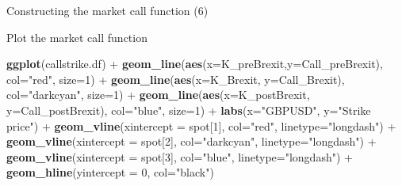 \documentclass[ignorenonframetext,aspectratio=169]{beamer}
\newenvironment{Shaded}{}{}
\newcommand{\KeywordTok}[1]{\textcolor[rgb]{0.00,0.44,0.13}{\textbf{#1}}}
\newcommand{\DataTypeTok}[1]{\textcolor[rgb]{0.56,0.13,0.00}{#1}}
\newcommand{\DecValTok}[1]{\textcolor[rgb]{0.25,0.63,0.44}{#1}}
\newcommand{\StringTok}[1]{\textcolor[rgb]{0.25,0.44,0.63}{#1}}
\newcommand{\OperatorTok}[1]{\textcolor[rgb]{0.40,0.40,0.40}{#1}}
\newcommand{\NormalTok}[1]{#1}
\begin{document}
\begin{frame}[fragile]{Constructing the market call function (6)}

Plot the market call function

\begin{Shaded}
\begin{Highlighting}[]
\KeywordTok{ggplot}\NormalTok{(callstrike.df) }\OperatorTok{+}
\StringTok{  }\KeywordTok{geom_line}\NormalTok{(}\KeywordTok{aes}\NormalTok{(}\DataTypeTok{x=}\NormalTok{K_preBrexit,}\DataTypeTok{y=}\NormalTok{Call_preBrexit), }\DataTypeTok{col=}\StringTok{"red"}\NormalTok{, }\DataTypeTok{size=}\DecValTok{1}\NormalTok{) }\OperatorTok{+}\StringTok{ }
\StringTok{  }\KeywordTok{geom_line}\NormalTok{(}\KeywordTok{aes}\NormalTok{(}\DataTypeTok{x=}\NormalTok{K_Brexit, }\DataTypeTok{y=}\NormalTok{Call_Brexit), }\DataTypeTok{col=}\StringTok{"darkcyan"}\NormalTok{, }\DataTypeTok{size=}\DecValTok{1}\NormalTok{) }\OperatorTok{+}
\StringTok{  }\KeywordTok{geom_line}\NormalTok{(}\KeywordTok{aes}\NormalTok{(}\DataTypeTok{x=}\NormalTok{K_postBrexit, }\DataTypeTok{y=}\NormalTok{Call_postBrexit), }\DataTypeTok{col=}\StringTok{"blue"}\NormalTok{, }\DataTypeTok{size=}\DecValTok{1}\NormalTok{) }\OperatorTok{+}
\StringTok{  }\KeywordTok{labs}\NormalTok{(}\DataTypeTok{x=}\StringTok{"GBPUSD"}\NormalTok{, }\DataTypeTok{y=}\StringTok{"Strike price"}\NormalTok{) }\OperatorTok{+}\StringTok{ }
\StringTok{  }\KeywordTok{geom_vline}\NormalTok{(}\DataTypeTok{xintercept =}\NormalTok{ spot[}\DecValTok{1}\NormalTok{], }\DataTypeTok{col=}\StringTok{"red"}\NormalTok{, }\DataTypeTok{linetype=}\StringTok{"longdash"}\NormalTok{) }\OperatorTok{+}\StringTok{ }
\StringTok{  }\KeywordTok{geom_vline}\NormalTok{(}\DataTypeTok{xintercept =}\NormalTok{ spot[}\DecValTok{2}\NormalTok{], }\DataTypeTok{col=}\StringTok{"darkcyan"}\NormalTok{, }\DataTypeTok{linetype=}\StringTok{"longdash"}\NormalTok{) }\OperatorTok{+}
\StringTok{  }\KeywordTok{geom_vline}\NormalTok{(}\DataTypeTok{xintercept =}\NormalTok{ spot[}\DecValTok{3}\NormalTok{], }\DataTypeTok{col=}\StringTok{"blue"}\NormalTok{, }\DataTypeTok{linetype=}\StringTok{"longdash"}\NormalTok{) }\OperatorTok{+}
\StringTok{  }\KeywordTok{geom_hline}\NormalTok{(}\DataTypeTok{yintercept =} \DecValTok{0}\NormalTok{, }\DataTypeTok{col=}\StringTok{"black"}\NormalTok{)}
\end{Highlighting}
\end{Shaded}

\end{frame}
\end{document}
